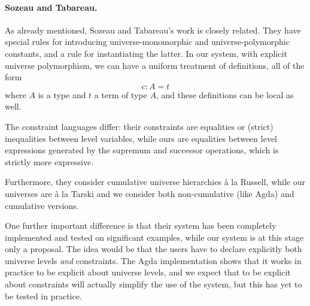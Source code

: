 \documentclass[11pt,a4paper]{article}
\theoremstyle{definition}
\newcommand{\UU}{\mathsf{U}}
\newcommand{\Type}{\mathsf{Type}}
\begin{document}
\paragraph{Sozeau and Tabareau.}

As already mentioned, Sozeau and Tabareau's \cite{SozeauTabareau:coq} work is closely related.
They have special rules for introducing universe-monomorphic and universe-polymorphic constants, and a rule for instantiating the latter.
In our system, with explicit universe polymorphism, we can have a uniform treatment of definitions, all of the form
$$ c : A = t$$
where $A$ is a type and $t$ a term of type $A$, and these definitions can be local as well.

The constraint languages differ: their constraints are equalities or (strict) inequalities between level variables, while ours are equalities between level expressions generated by the supremum and successor operations, which is strictly more expressive.

Furthermore, they consider cumulative universe hierarchies  \`a la Russell, while
our universes are \`a la Tarski and we consider both non-cumulative (like Agda) and cumulative versions.

%
One further important difference is that their system has been completely implemented and tested on
significant examples, while our system is at this stage only a proposal. The idea would be that the
users have to declare explicitly both universe levels {\em and} constraints. The Agda implementation
shows that it works in practice to be explicit about universe levels, and we expect that to be
explicit about constraints will actually simplify the use of the system, but this has yet to be tested in
practice.
\end{document}

